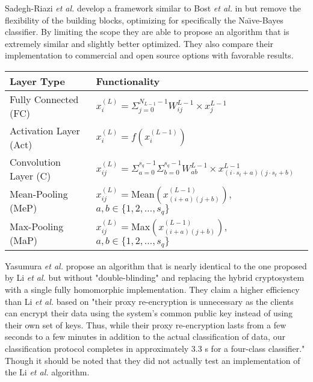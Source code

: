 \documentclass[]{article}
\begin{document}
\clearpage
Sadegh-Riazi \emph{et al.} \cite{SadeghRiazi2018} develop a framework similar to Bost \emph{et al.} in \cite{Bost2015} but remove the flexibility of the building blocks, optimizing for specifically the Na\"{\i}ve-Bayes classifier. 
By limiting the scope they are able to propose an algorithm that is extremely similar and slightly better optimized.
They also compare their implementation to commercial and open source options with favorable results.

\begingroup
\setlength{\FrameRule}{0pt}
\begin{framed}
	\centering
	\def\arraystretch{1.5}
\begin{tabular}{|l|l|}
	\hline
	\textbf{Layer Type} & \textbf{Functionality} \\
	\hline
	Fully Connected (FC) & $ x^{(L)}_i = 
		\varSigma^{N_{L-1}-1}_{j=0} W^{L-1}_{ij} \times x^{L-1}_j$ \\
	\hline
	Activation Layer (Act) & $ x^{(L)}_i = f( x^{(L-1)}_i) $ \\
	\hline
	Convolution Layer (C) & $ x^{(L)}_{ij} = \varSigma^{s_q-1}_{a=0} \varSigma^{s_q-1}_{b=0} 
		 W^{L-1}_{ab} \times x^{L-1}_{(i\cdot s_t+a)(j\cdot s_t+b)} $ \\
	\hline
	Mean-Pooling (MeP) & $ x^{(L)}_{ij} = 
			$Mean$(x^{(L-1)}_{(i+a)(j+b)}),$ $a,b\in\{1,2,\ldots,s_q\} $ \\
	\hline
	Max-Pooling (MaP) & $ x^{(L)}_{ij} = 
			$Max$(x^{(L-1)}_{(i+a)(j+b)}),$ $a,b\in\{1,2,\ldots,s_q\} $ \\
	\hline
\end{tabular}
\end{framed}
\vspace{-2.25em}
\vspace{1.5em}
\endgroup

Yasumura \emph{et al.} \cite{Yasumura2019} propose an algorithm that is nearly identical to the one proposed by Li \emph{et al.} \cite{Li2018} but without "double-blinding" and replacing the hybrid cryptosystem with a single fully homomorphic implementation. 
They claim a higher efficiency than Li \emph{et al.} based on 
"their proxy re-encryption is unnecessary as the clients can encrypt their data using the system’s common public key instead of using their own set of keys. Thus, while their proxy re-encryption lasts from a few seconds to a few minutes in addition to the actual classification of data, our classification protocol completes in approximately 3.3 s for a four-class classifier." \cite[p. 8]{Yasumura2019}
Though it should be noted that they did not actually test an implementation of the Li \emph{et al.} algorithm.
\end{document}
